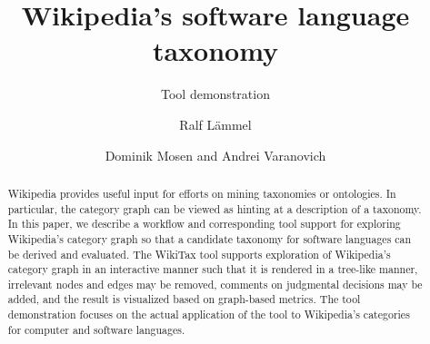 \documentclass[a4paper,runningheads]{myllncs}
\author{Ralf L\"ammel \and Dominik Mosen and Andrei Varanovich}
\institute{University of Koblenz-Landau, Software Languages Team}
\title{Wikipedia's software language taxonomy}
\subtitle{Tool demonstration}
\newcommand{\Wikipedia}{\textsf{Wikipedia}}
\newcommand{\WikiTax}{\textsf{WikiTax}}
\begin{document}
\maketitle

\begin{abstract} 

  \Wikipedia{} provides useful input for efforts on mining taxonomies or ontologies. In particular, the category graph can be viewed as hinting at a description of a taxonomy. In this paper, we describe a workflow and corresponding tool support for exploring \Wikipedia's category graph so that a candidate taxonomy for software languages can be derived and evaluated. The \WikiTax{} tool supports exploration of \Wikipedia's category graph in an interactive manner such that it is rendered in a tree-like manner, irrelevant nodes and edges may be removed, comments on judgmental decisions may be added, and the result is visualized based on graph-based metrics. The tool demonstration focuses on the actual application of the tool to \Wikipedia's categories for computer and software languages.

\end{abstract}











\end{document}
